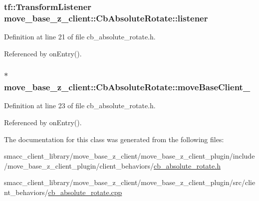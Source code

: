 \subsubsection[{\texorpdfstring{listener}{listener}}]{\setlength{\rightskip}{0pt plus 5cm}tf\+::\+Transform\+Listener move\+\_\+base\+\_\+z\+\_\+client\+::\+Cb\+Absolute\+Rotate\+::listener}\hypertarget{classmove__base__z__client_1_1CbAbsoluteRotate_a78740c9a93398f6a41bc4e5171e5a581}{}\label{classmove__base__z__client_1_1CbAbsoluteRotate_a78740c9a93398f6a41bc4e5171e5a581}


Definition at line 21 of file cb\+\_\+absolute\+\_\+rotate.\+h.



Referenced by on\+Entry().

\subsubsection[{\texorpdfstring{move\+Base\+Client\+\_\+}{moveBaseClient_}}]{$\ast$ move\+\_\+base\+\_\+z\+\_\+client\+::\+Cb\+Absolute\+Rotate\+::move\+Base\+Client\+\_\+}\hypertarget{classmove__base__z__client_1_1CbAbsoluteRotate_a2a96d8ec86bb2802391b044da7f10daf}{}\label{classmove__base__z__client_1_1CbAbsoluteRotate_a2a96d8ec86bb2802391b044da7f10daf}


Definition at line 23 of file cb\+\_\+absolute\+\_\+rotate.\+h.



Referenced by on\+Entry().



The documentation for this class was generated from the following files\+:\begin{DoxyCompactItemize}
\item 
smacc\+\_\+client\+\_\+library/move\+\_\+base\+\_\+z\+\_\+client/move\+\_\+base\+\_\+z\+\_\+client\+\_\+plugin/include/move\+\_\+base\+\_\+z\+\_\+client\+\_\+plugin/client\+\_\+behaviors/\hyperlink{cb__absolute__rotate_8h}{cb\+\_\+absolute\+\_\+rotate.\+h}\item 
smacc\+\_\+client\+\_\+library/move\+\_\+base\+\_\+z\+\_\+client/move\+\_\+base\+\_\+z\+\_\+client\+\_\+plugin/src/client\+\_\+behaviors/\hyperlink{cb__absolute__rotate_8cpp}{cb\+\_\+absolute\+\_\+rotate.\+cpp}\end{DoxyCompactItemize}
